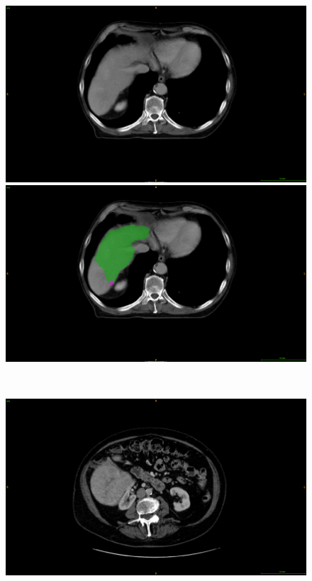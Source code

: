 \documentclass[]{article}
\begin{document}
\begin{figure}[ht!]
	\centering
	\begin{minipage}{0.45\linewidth}
		\includegraphics[width=\linewidth]{../Contributions/images/MisSegmentations/ResizeTCGA-DD-A3A1_slice80_raw}
	\end{minipage} \hspace{-0.1cm}
	\begin{minipage}{0.45\linewidth}
		\includegraphics[width=\linewidth]{../Contributions/images/MisSegmentations/ResizeTCGA-DD-A3A1_slice80_liverPrediction_Cmap}
	\end{minipage} \\
	\begin{minipage}{0.45\linewidth}
		\includegraphics[width=\linewidth]{../Contributions/images/MisSegmentations/ResizeTCGA-DD-A4NK_slice32_raw}

\end{minipage}
\end{figure}
\end{document}

